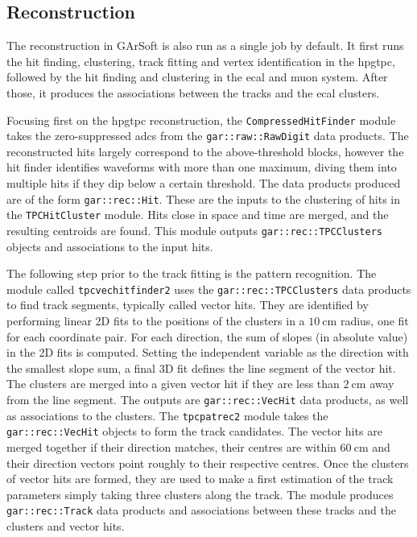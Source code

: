 \subsection{Reconstruction}

The reconstruction in GArSoft is also run as a single job by default. It first runs the hit finding, clustering, track fitting and vertex identification in the \gls{hpgtpc}, followed by the hit finding and clustering in the \gls{ecal} and muon system. After those, it produces the associations between the tracks and the \gls{ecal} clusters.

Focusing first on the \gls{hpgtpc} reconstruction, the \texttt{CompressedHitFinder} module takes the zero-suppressed \gls{adc}s from the \texttt{gar::raw::RawDigit} data products. The reconstructed hits largely correspond to the above-threshold blocks, however the hit finder identifies waveforms with more than one maximum, diving them into multiple hits if they dip below a certain threshold. The data products produced are of the form \texttt{gar::rec::Hit}. These are the inputs to the clustering of hits in the \texttt{TPCHitCluster} module. Hits close in space and time are merged, and the resulting centroids are found. This module outputs \texttt{gar::rec::TPCClusters} objects and associations to the input hits.

The following step prior to the track fitting is the pattern recognition. The module called \texttt{tpcvechitfinder2} uses the \texttt{gar::rec::TPCClusters} data products to find track segments, typically called vector hits. They are identified by performing linear 2D fits to the positions of the clusters in a $10~\mathrm{cm}$ radius, one fit for each coordinate pair. For each direction, the sum of slopes (in absolute value) in the 2D fits is computed. Setting the independent variable as the direction with the smallest slope sum, a final 3D fit defines the line segment of the vector hit. The clusters are merged into a given vector hit if they are less than $2~\mathrm{cm}$ away from the line segment. The outputs are \texttt{gar::rec::VecHit} data products, as well as associations to the clusters. The \texttt{tpcpatrec2} module takes the \texttt{gar::rec::VecHit} objects to form the track candidates. The vector hits are merged together if their direction matches, their centres are within $60~\mathrm{cm}$ and their direction vectors point roughly to their respective centres. Once the clusters of vector hits are formed, they are used to make a first estimation of the track parameters simply taking three clusters along the track. The module produces \texttt{gar::rec::Track} data products and associations between these tracks and the clusters and vector hits.

